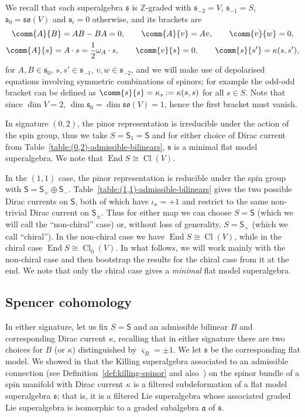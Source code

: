 \documentclass[pdftex]{sigma}
\numberwithin{equation}{section}
\newcommand{\fa}{\mathfrak{a}}
\newcommand{\fs}{\mathfrak{s}}
\newcommand{\fso}{\mathfrak{so}}
\newcommand{\ZZ}{\mathbb{Z}}
\newcommand{\ssS}{\mathsf{S}}
\newcommand{\1}{\mathbbm{1}}
\DeclareMathOperator{\End}{End}
\DeclareMathOperator{\Cl}{Cl}
\begin{document}
We recall that each superalgebra $\fs$ is $\ZZ$-graded with $\fs_{-2}=V$, $\fs_{-1}=S$, $\fs_0=\fso(V)$ and $\fs_i=0$ otherwise, and its brackets are
\begin{gather}
	\comm{A}{B} = AB-BA = 0,\qquad	
	\comm{A}{v} = Av,\qquad
	 \comm{v}{w} = 0,\nonumber	\\
	\comm{A}{s} = A\cdot s = \frac{1}{2}\omega_A\cdot s,\qquad
	 \comm{v}{s} = 0,\qquad
	 \comm{s}{s'} = \kappa(s,s'),\label{eq:2d-flat-brackets}
\end{gather}
for $A,B\in\fs_0$, $s,s'\in\fs_{-1}$, $v,w\in\fs_{-2}$, and we will make use of depolarised equations involving symmetric combinations of spinors; for example the odd-odd bracket can be defined as $\comm{s}{s}=\kappa_s:=\kappa(s,s)$ for all $s\in S$. Note that since $\dim V=2$, $\dim\fs_0=\dim\fso(V)=1$, hence the first bracket must vanish.

In signature $(0,2)$, the pinor representation is irreducible under the action of the spin group, thus we take $S=\ssS_1=\ssS$ and for either choice of Dirac current from Table~\ref{table:(0,2)-admissible-bilinears}, $\fs$ is a minimal flat model superalgebra. We note that $\End S\cong\Cl(V)$.

In the $(1,1)$ case, the pinor representation is reducible under the spin group with $\ssS=\ssS_+\oplus\ssS_-$. Table~\ref{table:(1,1)-admissible-bilinears} gives the two possible Dirac currents on $\ssS$, both of which have $\iota_\kappa=+1$ and restrict to the same non-trivial Dirac current on $\ssS_\pm$. Thus for either map we can choose $S=\ssS$ (which we will call the ``non-chiral'' case) or, without loss of generality, $S=\ssS_+$ (which we call ``chiral''). In the non-chiral case we have $\End S\cong\Cl(V)$, while in the chiral case $\End S\cong\Cl_{\overline 0}(V)$. In what follows, we will work mainly with the non-chiral case and then bootstrap the results for the chiral case from it at the end. We note that only the chiral case gives a \emph{minimal} flat model superalgebra.


\subsection{Spencer cohomology}

In either signature, let us fix $S=\ssS$ and an admissible bilinear $B$ and corresponding Dirac current $\kappa$, recalling that in either signature there are two choices for $B$ (or $\kappa$) distinguished by $\varsigma_B=\pm 1$. We let $\fs$ be the corresponding flat model. We showed in \cite[Theorem~3.10]{Beckett2024_2} that the Killing superalgebra associated to an admissible connection (see Definition~\ref{def:killing-spinor} and also~\cite[Definition~3.6]{Beckett2024_2}) on the spinor bundle of a spin manifold with Dirac current $\kappa$ is a filtered subdeformation of a flat model superalgebra $\fs$; that is, it is a filtered Lie superalgebra whose associated graded Lie superalgebra is isomorphic to a graded subalgebra $\fa$ of $\fs$.
\end{document}
